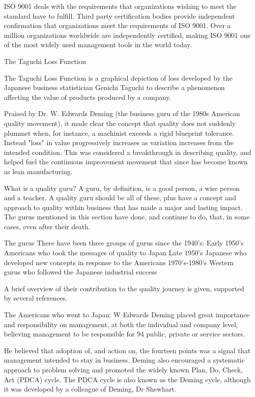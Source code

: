 ISO 9001 deals with the requirements that organizations wishing to meet the standard have to fulfill.
Third party certification bodies provide independent confirmation that organizations meet the requirements of ISO 9001. 
Over a million organizations worldwide are independently certified, making ISO 9001 one of the most widely used management tools in the world today.
 
 
The Taguchi Loss Function
 
The Taguchi Loss Function is a graphical depiction of loss developed by the Japanese 
business statistician Genichi Taguchi to describe a phenomenon affecting the value of 
products produced by a company. 
 
Praised by Dr. W. Edwards Deming (the business guru of the 1980s American quality movement), it 
made clear the concept that quality does not suddenly plummet when, for instance, a machinist 
exceeds a rigid blueprint tolerance. Instead "loss" in value progressively increases as variation 
increases from the intended condition. This was considered a breakthrough in describing quality, and helped fuel 
the continuous improvement movement that since has become known as lean manufacturing.

What is a quality guru?
A guru, by definition, is a good person, a wise person and a teacher. A quality guru should be all of these,
plus have a concept and approach to quality within business that has made a major and lasting impact. The
gurus mentioned in this section have done, and continue to do, that, in some cases, even after their death.
 
The gurus
There have been three groups of gurus since the 1940’s:
Early 1950’s Americans who took the messages of quality to Japan
Late 1950’s Japanese who developed new concepts in response to the Americans
1970’s-1980’s Western gurus who followed the Japanese industrial success
 
A brief overview of their contribution to the quality journey is given, supported by several references.
 
The Americans who went to Japan:
W Edwards Deming placed great importance and responsibility on management, at both the individual and company level, believing management to be responsible for 94%
public, private or service sectors.
 
He believed that adoption of, and action on, the fourteen points was a signal that management intended to stay in business. Deming also encouraged a systematic approach to problem solving and promoted the widely known Plan, Do, Check, Act (PDCA) cycle. The PDCA cycle is also known as the Deming cycle, although it was developed by a colleague of Deming, Dr Shewhart.
 
